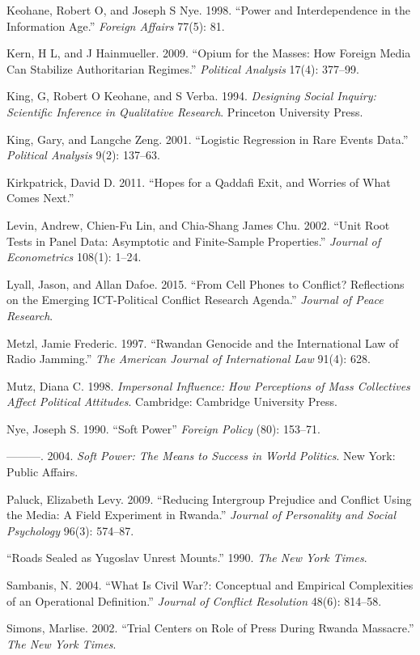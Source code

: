 \documentclass[11pt,article,oneside]{memoir}
\begin{document}
Keohane, Robert O, and Joseph S Nye. 1998. ``Power and Interdependence
in the Information Age.'' \emph{Foreign Affairs} 77(5): 81.

Kern, H L, and J Hainmueller. 2009. ``Opium for the Masses: How Foreign
Media Can Stabilize Authoritarian Regimes.'' \emph{Political Analysis}
17(4): 377--99.

King, G, Robert O Keohane, and S Verba. 1994. \emph{Designing Social
Inquiry: Scientific Inference in Qualitative Research}. Princeton
University Press.

King, Gary, and Langche Zeng. 2001. ``Logistic Regression in Rare Events
Data.'' \emph{Political Analysis} 9(2): 137--63.

Kirkpatrick, David D. 2011. ``Hopes for a Qaddafi Exit, and Worries of
What Comes Next.''

Levin, Andrew, Chien-Fu Lin, and Chia-Shang James Chu. 2002. ``Unit Root
Tests in Panel Data: Asymptotic and Finite-Sample Properties.''
\emph{Journal of Econometrics} 108(1): 1--24.

Lyall, Jason, and Allan Dafoe. 2015. ``From Cell Phones to Conflict?
Reflections on the Emerging ICT-Political Conflict Research Agenda.''
\emph{Journal of Peace Research}.

Metzl, Jamie Frederic. 1997. ``Rwandan Genocide and the International
Law of Radio Jamming.'' \emph{The American Journal of International Law}
91(4): 628.

Mutz, Diana C. 1998. \emph{Impersonal Influence: How Perceptions of Mass
Collectives Affect Political Attitudes}. Cambridge: Cambridge University
Press.

Nye, Joseph S. 1990. ``Soft Power'' \emph{Foreign Policy} (80): 153--71.

---------. 2004. \emph{Soft Power: The Means to Success in World
Politics}. New York: Public Affairs.

Paluck, Elizabeth Levy. 2009. ``Reducing Intergroup Prejudice and
Conflict Using the Media: A Field Experiment in Rwanda.'' \emph{Journal
of Personality and Social Psychology} 96(3): 574--87.

``Roads Sealed as Yugoslav Unrest Mounts.'' 1990. \emph{The New York
Times}.

Sambanis, N. 2004. ``What Is Civil War?: Conceptual and Empirical
Complexities of an Operational Definition.'' \emph{Journal of Conflict
Resolution} 48(6): 814--58.

Simons, Marlise. 2002. ``Trial Centers on Role of Press During Rwanda
Massacre.'' \emph{The New York Times}.
\end{document}
